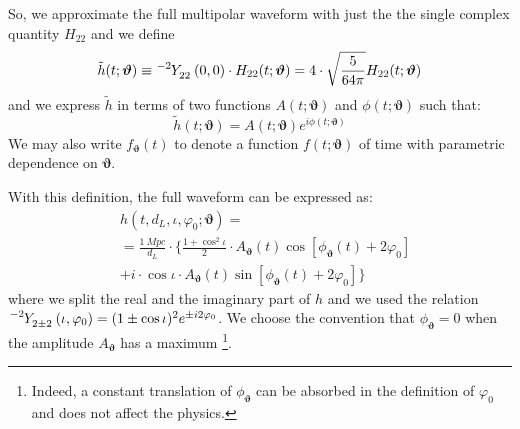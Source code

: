 So, we approximate the full multipolar waveform with just the  the single complex quantity $H_{22}$ and we define
\begin{equation}\label{eq:h_std}
	\tilde{h}(t; \boldsymbol{\vartheta}) \equiv \tensor[^{-2}]{Y}{_{2 2}}(0,0) \cdot H_{22}(t; \boldsymbol{\vartheta}) = 4\cdot\sqrt{\frac{5}{64\pi}}H_{22}(t; \boldsymbol{\vartheta})
\end{equation}
and we express $\tilde{h}$ in terms of two functions $A(t; \boldsymbol{\vartheta})$ and $\phi(t; \boldsymbol{\vartheta})$ such that:
\begin{equation}\label{eq:h_ML}
	\tilde{h}(t; \boldsymbol{\vartheta}) = A(t; \boldsymbol{\vartheta}) e^{i \phi(t; \boldsymbol{\vartheta})} 
\end{equation}
We may also write $f_{\boldsymbol{\vartheta}}(t)$ to denote a function $f(t;\boldsymbol{\vartheta})$ of time with parametric dependence on $\boldsymbol{\vartheta}$.
\par
With this definition, the full waveform can be expressed as:
\begin{align} 
	&h(t, d_L,\iota,\varphi_0; \boldsymbol{\vartheta}) =  \nonumber\\
		&= {\frac{\SI{1}{Mpc}}{d_L}} \cdot \Bigg\{ \frac{1+\cos^2\iota}{2} \cdot A_{\boldsymbol{\vartheta}}(t)  \cos[\phi_{\boldsymbol{\vartheta}}(t)+2\varphi_0]  \nonumber \\
		&+ i \cdot \cos\iota \cdot A_{\boldsymbol{\vartheta}}(t) \sin[\phi_{\boldsymbol{\vartheta}}(t)+2\varphi_0] \Bigg\}
\label{eq:h_parametrization_simple}
\end{align}
where we split the real and the imaginary part of $h$ and we used the relation ${\tensor[^{-2}]{Y}{_{2 \pm 2}}(\iota, \varphi_0) = (1 \pm \cos \iota)^2 e^{\pm i 2 \varphi_0}}$.
We choose the convention that $\phi_{\boldsymbol{\vartheta}} = 0$ when the amplitude $A_{\boldsymbol{\vartheta}}$ has a maximum
\footnote{Indeed, a constant translation of $\phi_{\boldsymbol{\vartheta}}$ can be absorbed in the definition of $\varphi_0$ and does not affect the physics.}.
\par

